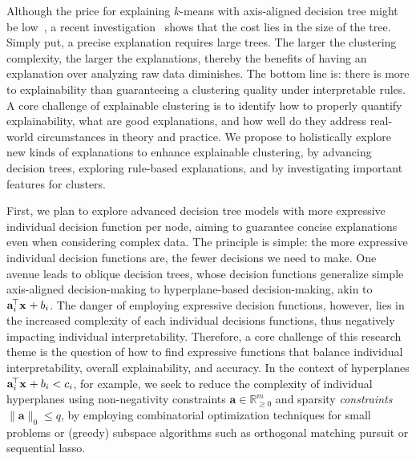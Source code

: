\documentclass[a4paper,11pt]{article}
\begin{document}
Although the price for explaining $k$-means with axis-aligned decision tree might be low~\cite{gupta2023price}, 
a recent investigation~\cite{deng2023impossibility} shows that the cost lies in the size of the tree.
Simply put, a precise explanation requires large trees.
The larger the clustering complexity, the larger the explanations, thereby 
the benefits of having an explanation over analyzing raw data diminishes.
The bottom line is: there is more to explainability than guaranteeing a clustering quality under interpretable rules.
A core challenge of explainable clustering is to identify how to properly quantify explainability,
what are good explanations, and how well do they address real-world circumstances in theory and practice.
We propose to holistically explore new kinds of explanations to enhance explainable clustering,
by advancing decision trees, exploring rule-based explanations, and by investigating important features for clusters.

First, we plan to explore advanced decision tree models with more expressive individual decision function per node, aiming to guarantee concise explanations even when considering complex data.
The principle is simple: the more expressive individual decision functions are, the fewer decisions we need to make. 
One avenue leads to oblique decision trees, whose decision functions generalize simple axis-aligned decision-making to hyperplane-based decision-making, akin to $\mathbf{a}_i^{\!\top} \mathbf{x}^{\vphantom{\top}}_{\vphantom{i}} + b_i$. %
The danger of employing expressive decision functions, however, lies in the increased complexity of each individual decisions functions, thus negatively impacting individual interpretability.
Therefore, a core challenge of this research theme is the question of how to find expressive functions that balance individual interpretability, overall explainability, and accuracy.
In the context of hyperplanes $\mathbf{a}_i^{\!\top} \mathbf{x}^{\vphantom{\top}}_{\vphantom{i}} + b_i < c_i$, for example, we seek to reduce the complexity of individual hyperplanes using non-negativity constraints $\mathbf{a} \in \mathbb{R}^m_{\geq 0}$ and sparsity \emph{constraints} $\|\mathbf{a}\|_0 \leq q$, by employing combinatorial optimization techniques for small problems or (greedy) subspace algorithms such as orthogonal matching pursuit or sequential lasso.
\end{document}
